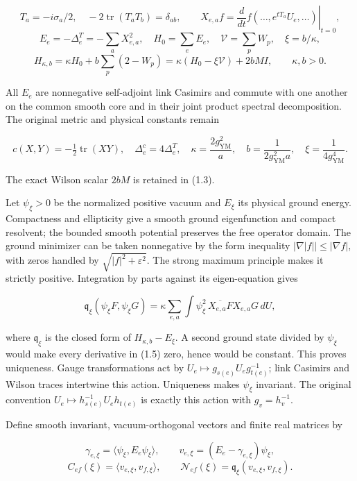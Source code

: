 \documentclass[
  11pt,
]{article}
\begin{document}
\[
T_a=-i\sigma_a/2,\quad -2\operatorname{tr}(T_aT_b)=\delta_{ab},\qquad
X_{e,a}f=\left.\frac{d}{dt}f(\ldots,e^{tT_a}U_e,\ldots)\right|_{t=0},
\] \[
E_e=-\Delta_e^T=-\sum_aX_{e,a}^2,\quad
H_0=\sum_eE_e,\quad \mathcal V=\sum_pW_p,\quad \xi=b/\kappa,
\] \[
H_{\kappa,b}=\kappa H_0+b\sum_p(2-W_p)
=\kappa(H_0-\xi\mathcal V)+2bM I,\qquad \kappa,b>0.
\tag{1.3}
\]

All \(E_e\) are nonnegative self-adjoint link Casimirs and commute with
one another on the common smooth core and in their joint product
spectral decomposition. The original metric and physical constants
remain

\[
c(X,Y)=-\tfrac12\operatorname{tr}(XY),\quad
\Delta_e^c=4\Delta_e^T,\quad
\kappa=\frac{2g_{\mathrm{YM}}^2}{a},\quad
b=\frac1{2g_{\mathrm{YM}}^2a},\quad
\xi=\frac1{4g_{\mathrm{YM}}^4}.
\tag{1.4}
\]

The exact Wilson scalar \(2bM\) is retained in (1.3).

Let \(\psi_\xi>0\) be the normalized positive vacuum and \(E_\xi\) its
physical ground energy. Compactness and ellipticity give a smooth ground
eigenfunction and compact resolvent; the bounded smooth potential
preserves the free operator domain. The ground minimizer can be taken
nonnegative by the form inequality \(|\nabla|f||\le|\nabla f|\), with
zeros handled by \(\sqrt{|f|^2+\varepsilon^2}\). The strong maximum
principle makes it strictly positive. Integration by parts against its
eigen-equation gives

\[
\mathfrak q_\xi(\psi_\xi F,\psi_\xi G)
=\kappa\sum_{e,a}\int\psi_\xi^2\,
\overline{X_{e,a}F}X_{e,a}G\,dU,
\tag{1.5}
\]

where \(\mathfrak q_\xi\) is the closed form of \(H_{\kappa,b}-E_\xi\).
A second ground state divided by \(\psi_\xi\) would make every
derivative in (1.5) zero, hence would be constant. This proves
uniqueness. Gauge transformations act by
\(U_e\mapsto g_{s(e)}U_eg_{t(e)}^{-1}\); link Casimirs and Wilson traces
intertwine this action. Uniqueness makes \(\psi_\xi\) invariant. The
original convention \(U_e\mapsto h_{s(e)}^{-1}U_eh_{t(e)}\) is exactly
this action with \(g_v=h_v^{-1}\).

Define smooth invariant, vacuum-orthogonal vectors and finite real
matrices by

\[
\gamma_{e,\xi}=\langle\psi_\xi,E_e\psi_\xi\rangle,\qquad
v_{e,\xi}=(E_e-\gamma_{e,\xi})\psi_\xi,
\] \[
C_{ef}(\xi)=\langle v_{e,\xi},v_{f,\xi}\rangle,\qquad
\mathcal N_{ef}(\xi)=\mathfrak q_\xi(v_{e,\xi},v_{f,\xi}).
\tag{1.6}
\]
\end{document}
